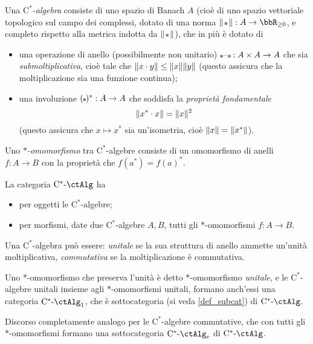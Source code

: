 \begin{example}\label{ex_cat_C_star_algebre}
	Una \emph{\(\mathrm{C}^*\)-algebra} consiste di uno spazio di Banach \(A\) (cioè di uno spazio vettoriale topologico sul campo dei complessi, dotato di una norma \(\norm{\blank} : A \to \bbR_{\ge 0}\), e completo rispetto alla metrica indotta da \(\norm{\blank}\)), che in più è dotato di
	\begin{itemize}
		\item una operazione di anello (possibilmente non unitario) \(\blank\cdot\blank : A \times A \to A\) che sia \emph{submoltiplicativa}, cioè tale che \(\|x\cdot y\| \le\|x\|\|y\|\) (questo assicura che la moltiplicazione sia una funzione continua);
		\item una involuzione \((\blank)^* : A\to A\) che soddisfa la \emph{proprietà fondamentale}
		      \[\|x^*\cdot x\| = \|x\|^2\]
		      (questo assicura che \(x\mapsto x^*\) sia un'isometria, cioè \(\|x\| = \|x^*\|\)).
	\end{itemize}
	Uno \emph{\(*\)-omomorfismo} tra \(\mathrm{C}^*\)-algebre consiste di un omomorfismo di anelli \(f : A\to B\) con la proprietà che \(f(a^*) = f(a)^*\).

	La categoria \(\ctCsAlg\) ha
	\begin{itemize}
		\item per oggetti le \(\mathrm{C}^*\)-algebre;
		\item per morfismi, date due \(\mathrm{C}^*\)-algebre \(A,B\), tutti gli \(*\)-omomorfismi \(f : A \to B\).
	\end{itemize}
	Una \(\mathrm{C}^*\)-algebra può essere: \emph{unitale} se la sua struttura di anello ammette un'unità moltiplicativa, \emph{commutativa} se la moltiplicazione è commutativa.

	Uno \(*\)-omomorfismo che preserva l'unità è detto \(*\)-omomorfismo \emph{unitale}, e le \(\mathrm{C}^*\)-algebre unitali insieme agli \(*\)-omomorfismi unitali, formano anch'essi una categoria \(\ctCsAlg_1\), che è sottocategoria (si veda \ref{def_subcat}) di \(\ctCsAlg\).

	Discorso completamente analogo per le \(\mathrm{C}^*\)-algebre commutative, che con tutti gli \(*\)-omomorfismi formano una sottocategoria \(\ctCsAlg_c\) di \(\ctCsAlg\).
\end{example}
